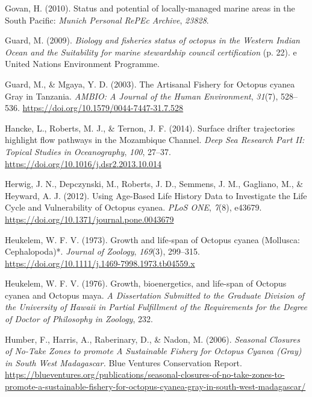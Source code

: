 \documentclass[
]{article}
\newlength{\cslhangindent}
\newlength{\cslentryspacingunit} %
\newenvironment{CSLReferences}[2] %
 {%
  \setlength{\parindent}{0pt}
  \ifodd #1
  \let\oldpar\par
  \def\par{\hangindent=\cslhangindent\oldpar}
  \fi
  \setlength{\parskip}{#2\cslentryspacingunit}
 }%
 {}
\begin{document}
\begin{CSLReferences}{1}{2}
\leavevmode{}%
Govan, H. (2010). Status and potential of locally-managed marine areas in the {South} {Pacific}: \emph{Munich Personal RePEc Archive}, \emph{23828}.

\leavevmode{}%
Guard, M. (2009). \emph{Biology and fisheries status of octopus in the {Western} {Indian} {Ocean} and the {Suitability} for marine stewardship council certification} (p. 22). e United Nations Environment Programme.

\leavevmode{}%
Guard, M., \& Mgaya, Y. D. (2003). The {Artisanal} {Fishery} for {Octopus} cyanea {Gray} in {Tanzania}. \emph{AMBIO: A Journal of the Human Environment}, \emph{31}(7), 528--536. \url{https://doi.org/10.1579/0044-7447-31.7.528}

\leavevmode{}%
Hancke, L., Roberts, M. J., \& Ternon, J. F. (2014). Surface drifter trajectories highlight flow pathways in the {Mozambique} {Channel}. \emph{Deep Sea Research Part II: Topical Studies in Oceanography}, \emph{100}, 27--37. \url{https://doi.org/10.1016/j.dsr2.2013.10.014}

\leavevmode{}%
Herwig, J. N., Depczynski, M., Roberts, J. D., Semmens, J. M., Gagliano, M., \& Heyward, A. J. (2012). Using {Age}-{Based} {Life} {History} {Data} to {Investigate} the {Life} {Cycle} and {Vulnerability} of {Octopus} cyanea. \emph{PLoS ONE}, \emph{7}(8), e43679. \url{https://doi.org/10.1371/journal.pone.0043679}

\leavevmode{}%
Heukelem, W. F. V. (1973). Growth and life‐span of {Octopus} cyanea ({Mollusca}: {Cephalopoda})*. \emph{Journal of Zoology}, \emph{169}(3), 299--315. \url{https://doi.org/10.1111/j.1469-7998.1973.tb04559.x}

\leavevmode{}%
Heukelem, W. F. V. (1976). Growth, bioenergetics, and life-span of {Octopus} cyanea and {Octopus} maya. \emph{A Dissertation Submitted to the Graduate Division of the University of Hawaii in Partial Fulfillment of the Requirements for the Degree of Doctor of Philosophy in Zoology}, 232.

\leavevmode{}%
Humber, F., Harris, A., Raberinary, D., \& Nadon, M. (2006). \emph{Seasonal {Closures} of {No}-{Take} {Zones} to promote {A} {Sustainable} {Fishery} for {Octopus} {Cyanea} ({Gray}) in {South} {West} {Madagascar}.} Blue Ventures Conservation Report. \url{https://blueventures.org/publications/seasonal-closures-of-no-take-zones-to-promote-a-sustainable-fishery-for-octopus-cyanea-gray-in-south-west-madagascar/}


\end{CSLReferences}
\end{document}

